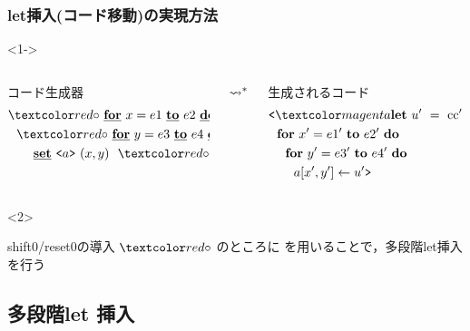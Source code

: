 \begin{frame}
  \frametitle{let挿入(コード移動)の実現方法}

  \begin{visibleenv}<1->
    \begin{columns}
      \begin{column}{0.5\textwidth}%
        コード生成器
        \begin{align*}
          & \red{\circ}~ \cfordo{x = e1}{e2} \\
          & ~~\red{\circ}~ \cfordo{y = e3}{e4} \\
          & ~~~~~~\caryset{\code{a}}{(x,y)}~ \red{\circ}~ \text{cc}
        \end{align*}
      \end{column}
      $\leadsto^*$
      \begin{column}{0.5\textwidth}%
        生成されるコード
        \begin{align*}
          & \cbra \magenta{\Let ~u' ~= ~\text{cc}' ~\In} \\
          & ~~\fordo{x' = e1'}{e2'} \\
          & ~~~~\fordo{y' = e3'}{e4'} \\
          & ~~~~~~\aryset{a}{x',y'}{u'} \cket
        \end{align*}
      \end{column}
    \end{columns}
  \end{visibleenv}

  \begin{visibleenv}<2>
    \begin{exampleblock}{shift0/reset0の導入}
      $\red{\circ}$ のところに  を用いることで，多段階let挿入を行う
    \end{exampleblock}
  \end{visibleenv}
\end{frame}

\subsection{多段階let 挿入}

